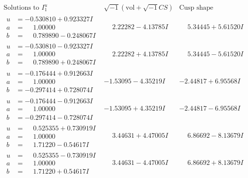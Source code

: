 \documentclass[1p]{elsarticle_modified}
\theoremstyle{definition}
\newcommand{\I}{\sqrt{-1}}
\begin{document}
$$\begin{array}{c|c|c}  
\text{Solutions to }I^u_{1}& \I (\text{vol} + \sqrt{-1}CS) & \text{Cusp shape}\\
 \hline 
\begin{aligned}
u &= -0.530810 + 0.923327 I \\
a &= \phantom{-}1.00000\phantom{ +0.000000I} \\
b &= \phantom{-}0.789890 - 0.248067 I\end{aligned}
 & \phantom{-}2.22282 - 4.13785 I & \phantom{-}5.34445 + 5.61520 I \\ \hline\begin{aligned}
u &= -0.530810 - 0.923327 I \\
a &= \phantom{-}1.00000\phantom{ +0.000000I} \\
b &= \phantom{-}0.789890 + 0.248067 I\end{aligned}
 & \phantom{-}2.22282 + 4.13785 I & \phantom{-}5.34445 - 5.61520 I \\ \hline\begin{aligned}
u &= -0.176444 + 0.912663 I \\
a &= \phantom{-}1.00000\phantom{ +0.000000I} \\
b &= -0.297414 + 0.728074 I\end{aligned}
 & -1.53095 - 4.35219 I & -2.44817 + 6.95568 I \\ \hline\begin{aligned}
u &= -0.176444 - 0.912663 I \\
a &= \phantom{-}1.00000\phantom{ +0.000000I} \\
b &= -0.297414 - 0.728074 I\end{aligned}
 & -1.53095 + 4.35219 I & -2.44817 - 6.95568 I \\ \hline\begin{aligned}
u &= \phantom{-}0.525355 + 0.730919 I \\
a &= \phantom{-}1.00000\phantom{ +0.000000I} \\
b &= \phantom{-}1.71220 - 0.54617 I\end{aligned}
 & \phantom{-}3.44631 + 4.47005 I & \phantom{-}6.86692 - 8.13679 I \\ \hline\begin{aligned}
u &= \phantom{-}0.525355 - 0.730919 I \\
a &= \phantom{-}1.00000\phantom{ +0.000000I} \\
b &= \phantom{-}1.71220 + 0.54617 I\end{aligned}
 & \phantom{-}3.44631 - 4.47005 I & \phantom{-}6.86692 + 8.13679 I \\ \hline\begin{aligned}

\end{aligned}
\end{array}$$
\end{document}
